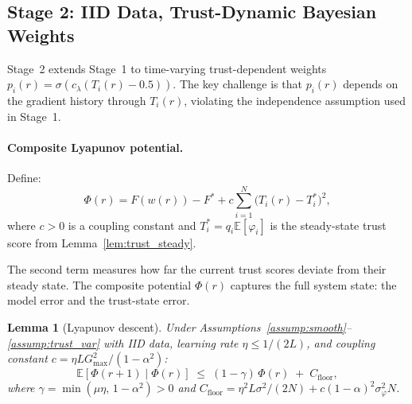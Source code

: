 \documentclass{article}
\newtheorem{lemma}[theorem]{Lemma}
\newcommand{\E}{\mathbb{E}}
\newcommand{\LyapV}{\Phi}
\begin{document}
\subsection{Stage 2: IID Data, Trust-Dynamic Bayesian Weights}
\label{sec:stage2}

Stage~2 extends Stage~1 to time-varying trust-dependent weights
$p_i(r) = \sigma(c_\lambda(T_i(r) - 0.5))$.
The key challenge is that $p_i(r)$ depends on the gradient history through
$T_i(r)$, violating the independence assumption used in Stage~1.

\paragraph{Composite Lyapunov potential.}
Define:
\begin{equation}
  \LyapV(r)
  = F(w(r)) - F^*
  + c \sum_{i=1}^N \bigl(T_i(r) - T_i^*\bigr)^2,
  \label{eq:lyapunov}
\end{equation}
where $c > 0$ is a coupling constant and $T_i^* = q_i\E[\varphi_i]$
is the steady-state trust score from Lemma~\ref{lem:trust_steady}.

The second term measures how far the current trust scores deviate from their
steady state.
The composite potential $\LyapV(r)$ captures the full system state: the model
error and the trust-state error.

\begin{lemma}[Lyapunov descent]
\label{lem:lyapunov}
Under Assumptions~\ref{assump:smooth}--\ref{assump:trust_var} with IID data,
learning rate $\eta \leq 1/(2L)$, and coupling constant
$c = \eta L G_{\max}^2 / (1-\alpha^2)$:
\begin{equation}
  \E[\LyapV(r+1) \mid \LyapV(r)]
  \;\leq\;
  (1 - \gamma)\,\LyapV(r)
  \;+\;
  C_{\mathrm{floor}},
  \label{eq:lyapunov_descent}
\end{equation}
where $\gamma = \min(\mu\eta,\, 1-\alpha^2) > 0$ and
$C_{\mathrm{floor}} = \eta^2 L\sigma^2/(2N) + c(1-\alpha)^2\sigma_\varphi^2 N$.
\end{lemma}
\end{document}
